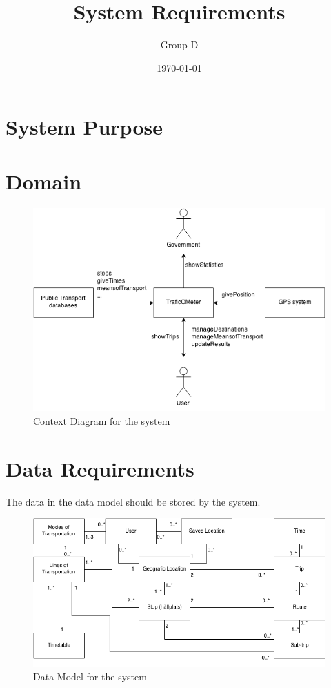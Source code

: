\documentclass[a4paper]{article}
\title{System Requirements}
\author{Group D}
\date{\today}
\begin{document}
	\maketitle
	\thispagestyle{empty}
	\setcounter{page}{0}
	\pagebreak
	\tableofcontents
	\pagebreak
	

	\section{System Purpose} %
	\section{Domain}
		\begin{figure}[h]
				\includegraphics[scale=0.65]{Context-v1.png}
			\caption{Context Diagram for the system}
		\end{figure}
	\newpage
	\section{Data Requirements}
		The data in the data model should be stored by the system.	
		\begin{figure}[h]
			\includegraphics[scale=0.50]{Datamodel-v1.png}
			\caption{Data Model for the system}
		\end{figure}	
\end{document}
